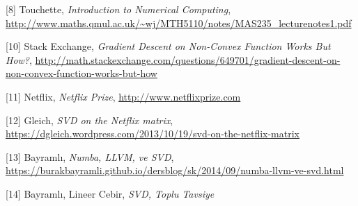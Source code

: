 \documentclass[12pt,fleqn]{article}\usepackage{../../common}
\begin{document}
[8] Touchette, {\em Introduction to Numerical Computing},
    \url{http://www.maths.qmul.ac.uk/~wj/MTH5110/notes/MAS235_lecturenotes1.pdf}

[10] Stack Exchange, {\em Gradient Descent on Non-Convex Function Works But How?},
     \url{http://math.stackexchange.com/questions/649701/gradient-descent-on-non-convex-function-works-but-how}

[11] Netflix, {\em Netflix Prize},
     \url{http://www.netflixprize.com}

[12] Gleich, {\em SVD on the Netflix matrix},
     \url{https://dgleich.wordpress.com/2013/10/19/svd-on-the-netflix-matrix}

[13] Bayramlı, {\em Numba, LLVM, ve SVD}, 
     \url{https://burakbayramli.github.io/dersblog/sk/2014/09/numba-llvm-ve-svd.html}

[14] Bayramlı, Lineer Cebir, {\em SVD, Toplu Tavsiye}
\end{document}
